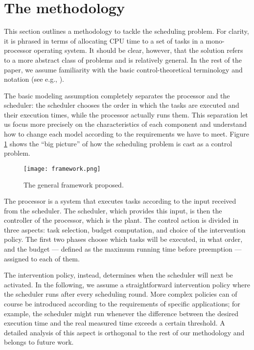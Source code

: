 \documentclass[a4paper]{article}
\begin{document}
\section{The methodology}
\label{sec:methodology}
This section outlines a methodology to tackle the scheduling problem.
For clarity, it is phrased in terms of allocating CPU time to a set of tasks in
a mono-processor operating system. It should be clear, however, that the 
solution refers to a more abstract class of problems and is relatively general.
In the rest of the paper, we assume familiarity with the basic 
control-theoretical terminology and notation (see e.g., 
\cite{HellersteinEtAl-2004a}).

The basic modeling assumption completely separates the processor and the 
scheduler: the scheduler chooses the order in which the tasks are executed and
their execution times, while the processor actually runs them.
This separation let us focus more precisely on the characteristics of each 
component and understand how to change each model according to the requirements 
we have to meet.
Figure \ref{fig:framework} shows the ``big picture'' of how the scheduling 
problem is cast as a control problem.
\begin{figure}[t]
  \centering
  \texttt{[image: framework.png]}
  \caption{The general framework proposed.}
  \label{fig:framework}
\end{figure}

The processor is a system that executes tasks according to the input 
received from the scheduler. The scheduler, which provides this input, is then 
the controller of the processor, which is the plant. The control action is 
divided in three aspects: task selection, budget computation, and choice of 
the intervention policy. The first two phases choose which tasks will be 
executed, in what order, and the budget --- defined as the maximum running time before 
preemption --- assigned to each of them.

The intervention policy, instead, determines when the scheduler will next be 
activated. In the following, we assume a straightforward intervention policy
where the scheduler runs after every scheduling round. More complex policies 
can of course be introduced according to the requirements of specific
applications; for example, the scheduler might run whenever the difference
between the desired execution time and the real measured time exceeds a certain
threshold. A detailed analysis of this aspect is orthogonal to the rest of our
methodology and belongs to future work.
\end{document}
